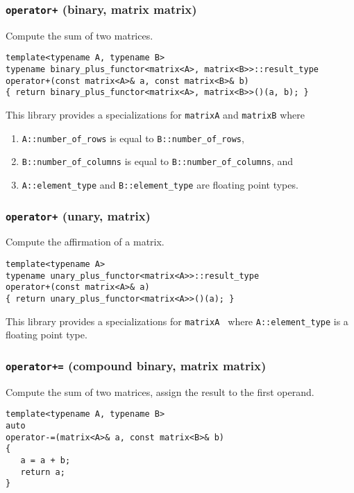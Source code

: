 \documentclass[oneside]{book}
\begin{document}
\subsubsection{\texttt{operator+} (binary, matrix matrix)}
Compute the sum of two matrices.
\begin{verbatim}
template<typename A, typename B>
typename binary_plus_functor<matrix<A>, matrix<B>>::result_type
operator+(const matrix<A>& a, const matrix<B>& b)
{ return binary_plus_functor<matrix<A>, matrix<B>>()(a, b); }
\end{verbatim}
This library provides a specializations for \texttt{matrix\textlangle A\textrangle}
and \texttt{matrix\textlangle B\textrangle} where
\begin{enumerate}
	\item \texttt{A::number\_of\_rows} is equal to \texttt{B::number\_of\_rows},
    \item \texttt{B::number\_of\_columns} is equal to \texttt{B::number\_of\_columns}, and
	\item \texttt{A::element\_type} and \texttt{B::element\_type} are floating point types.
\end{enumerate}

\subsubsection{\texttt{operator+} (unary, matrix)}
Compute the affirmation of a matrix.
\begin{verbatim}
template<typename A>
typename unary_plus_functor<matrix<A>>::result_type
operator+(const matrix<A>& a)
{ return unary_plus_functor<matrix<A>>()(a); }
\end{verbatim}
This library provides a specializations for \texttt{matrix\textlangle A
\textrangle} where  \texttt{A::element\_type} is a floating point type.

\subsubsection{\texttt{operator+=} (compound binary, matrix matrix)}
Compute the sum of two matrices, assign the result to the first operand.
\begin{verbatim}
template<typename A, typename B>
auto
operator-=(matrix<A>& a, const matrix<B>& b)
{
   a = a + b;
   return a;
}
\end{verbatim}
\end{document}
